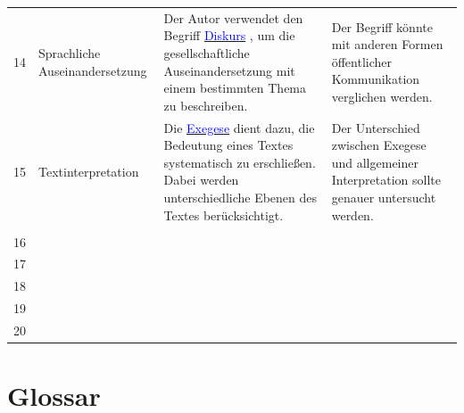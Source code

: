 \documentclass[11pt,a4paper]{article}
\makeatletter
\newcommand{\gls}[1]{%
    \hyperlink{glossar:#1}{\textcolor{blue}{#1}}%
}
\newcommand{\chapterrow}[1]{%
    \rowcolor{gray!10}%
    \multicolumn{4}{@{}l@{}}{\color{headerblue}\textbf{\large #1}}%
    \\[3pt]%
}
\makeatother
\begin{document}
\begin{longtable}{@{}p{2cm}p{4.5cm}p{9.5cm}p{9.5cm}@{}}
\\[2.5cm]

14
&
Sprachliche Auseinandersetzung
&
Der Autor verwendet den Begriff
\gls{Diskurs}, um die gesellschaftliche
Auseinandersetzung mit einem bestimmten
Thema zu beschreiben.
&
Der Begriff könnte mit anderen Formen
öffentlicher Kommunikation verglichen werden.

\\[2.5cm]

15
&
Textinterpretation
&
Die \gls{Exegese} dient dazu, die Bedeutung
eines Textes systematisch zu erschließen.
Dabei werden unterschiedliche Ebenen
des Textes berücksichtigt.
&
Der Unterschied zwischen Exegese und
allgemeiner Interpretation sollte genauer
untersucht werden.

\\[2.5cm]

\chapterrow{Test}

16
&
&
&
\\[2.5cm]

17
&
&
&
\\[2.5cm]

18
&
&
&
\\[2.5cm]

19
&
&
&
\\[2.5cm]

20
&
&
&
\\[2.5cm]

\end{longtable}

\normalsize


\newpage

\section*{Glossar}

\renewcommand{\arraystretch}{1.5}
\end{document}
